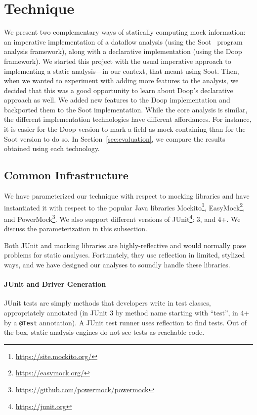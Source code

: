 \section{Technique}
\label{sec:technique}

We present two complementary ways of statically computing mock information: an imperative implementation of a dataflow analysis (using the Soot~\cite{Vallee-Rai:1999:SJB:781995.782008} program analysis framework), along with a declarative implementation (using the Doop~\cite{bravenboer09:_stric_declar_specif_sophis_point_analy} framework). We started this project with the usual imperative approach to implementing a static analysis---in our context, that meant using Soot. Then, when we wanted to experiment with adding more features to the analysis, we decided that this was a good opportunity to learn about Doop's declarative approach as well. We added new features to the Doop implementation and backported them to the Soot implementation. While the core analysis is similar, the different implementation technologies have different affordances. For instance, it is easier for the Doop version to mark a field as mock-containing than for the Soot version to do so. In Section~\ref{sec:evaluation}, we compare the results obtained using each technology.

\subsection{Common Infrastructure}
We have parameterized our technique with respect to mocking libraries and have instantiated it with respect to the popular Java libraries Mockito\footnote{\url{https://site.mockito.org/}}, EasyMock\footnote{\url{https://easymock.org/}}, and PowerMock\footnote{\url{https://github.com/powermock/powermock}}. We also support different versions of JUnit\footnote{\url{https://junit.org}}: 3, and 4+. We discuss the parameterization in this subsection.

Both JUnit and mocking libraries are highly-reflective and would normally pose problems for static analyses. Fortunately, they use reflection in limited, stylized ways, and we have designed our analyses to soundly handle these libraries.

\paragraph{JUnit and Driver Generation}
JUnit tests are simply methods that developers write in test classes, appropriately annotated (in JUnit 3 by method name starting with ``test'', in 4+ by a \texttt{@Test} annotation). A JUnit test runner uses reflection to find tests. Out of the box, static analysis engines do not see tests as reachable code.


